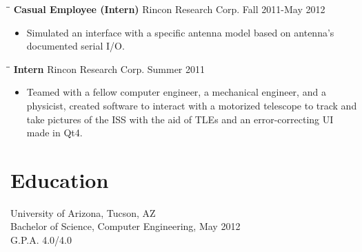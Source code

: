 \documentclass{res}
\begin{document}
\begin{resume}
  \vspace{-20pt}\begin{tabbing}
    \hspace{2.3in}\= \hspace{2.6in}\= \kill %
    {\bf Casual Employee (Intern)} \>Rincon Research Corp. \> Fall 2011-May 2012
  \end{tabbing}\vspace{-5pt}
    \begin{itemize} %
      \item[] Simulated an interface with a specific antenna model based on antenna's documented serial I/O.

    \end{itemize}
     
  \vspace{-20pt}\begin{tabbing}
    \hspace{2.3in}\= \hspace{2.6in}\= \kill %
    {\bf Intern} \>Rincon Research Corp. \> Summer 2011
  \end{tabbing}\vspace{-5pt}
    \begin{itemize} %
      \item[] Teamed with a fellow computer engineer, a mechanical engineer, and a
      physicist, created software to interact with a motorized telescope to track
      and take pictures of the ISS with the aid of TLEs and an error-correcting UI made in Qt4.  
    \end{itemize}

  
\section{Education}
\vspace{0.1in} 
  University of Arizona, Tucson, AZ  \\        
  Bachelor of Science, Computer Engineering, May 2012   \\       
  G.P.A. 4.0/4.0          

  

\end{resume}
\end{document}
